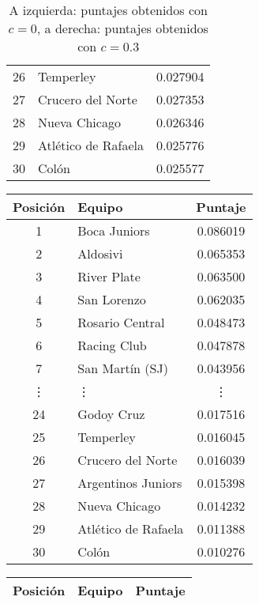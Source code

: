 \begin{table}[H]
\begin{center}
\begin{tabular}{| c | l | c |}
            26 & Temperley & 0.027904 \\
            27 & Crucero del Norte & 0.027353 \\
            28 & Nueva Chicago & 0.026346 \\
            29 & Atlético de Rafaela & 0.025776 \\
            30 & Colón & 0.025577 \\
            \hline
        \end{tabular}
        \captionsetup{justification=centering}
        \caption{A izquierda: puntajes obtenidos con $c=0$, a derecha: puntajes obtenidos con $c=0.3$}
        \label{exp_resultados_variar_c_1}
    \end{center}
\end{table}

\begin{table}[H]
    \begin{center}
        \begin{tabular}{| c | l | c |}
            \hline
            Posición & Equipo & Puntaje \\ \hline
            1 & Boca Juniors & 0.086019 \\
            2 & Aldosivi & 0.065353 \\
            3 & River Plate & 0.063500 \\
            4 & San Lorenzo & 0.062035 \\
            5 & Rosario Central & 0.048473 \\
            6 & Racing Club & 0.047878 \\
            7 & San Martín (SJ) & 0.043956 \\
            \vdots & \quad\vdots & \vdots \\
            24 & Godoy Cruz & 0.017516 \\
            25 & Temperley & 0.016045 \\
            26 & Crucero del Norte & 0.016039 \\
            27 & Argentinos Juniors & 0.015398 \\
            28 & Nueva Chicago & 0.014232 \\
            29 & Atlético de Rafaela & 0.011388 \\
            30 & Colón & 0.010276 \\
            \hline
        \end{tabular}
        \begin{tabular}{| c | l | c |}
            \hline
            Posición & Equipo & Puntaje \\ \hline

\end{tabular}
\end{center}
\end{table}
